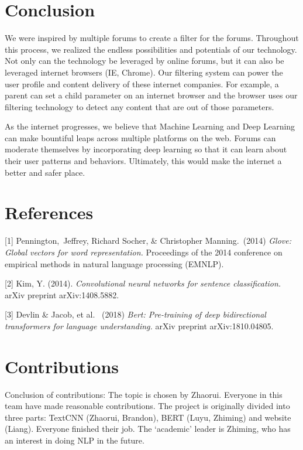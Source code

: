 \documentclass{article}
\begin{document}
\section{Conclusion}
We were inspired by multiple forums to create a filter for the forums. Throughout this process, we realized the endless possibilities and potentials of our technology. Not only can the technology be leveraged by online forums, but it can also be leveraged internet browsers (IE, Chrome). Our filtering system can power the user profile and content delivery of these internet companies. For example, a parent can set a child parameter on an internet browser and the browser uses our filtering technology to detect any content that are out of those parameters. 

As the internet progresses, we believe that Machine Learning and Deep Learning can make bountiful leaps across multiple platforms on the web. Forums can moderate themselves by incorporating deep learning so that it can learn about their user patterns and behaviors. Ultimately, this would make the internet a better and safer place. 


\section*{References}

\small

[1] Pennington,\ Jeffrey, Richard Socher, \& Christopher Manning.\ (2014) {\it Glove: Global vectors for word representation.} Proceedings of the 2014 conference on empirical methods in natural language processing (EMNLP).

[2] Kim, Y. (2014). {\it Convolutional neural networks for sentence classification.} arXiv preprint arXiv:1408.5882.

[3] Devlin \& Jacob, et al. \ (2018) {\it Bert: Pre-training of deep bidirectional transformers for language understanding.} arXiv preprint arXiv:1810.04805.


\section*{Contributions}
Conclusion of contributions: The topic is chosen by Zhaorui. Everyone in this team have made reasonable contributions. The project is originally divided into three parts: TextCNN (Zhaorui, Brandon), BERT (Luyu, Zhiming) and website (Liang). Everyone finished their job. The ‘academic’ leader is Zhiming, who has an interest in doing NLP in the future. 
\end{document}
